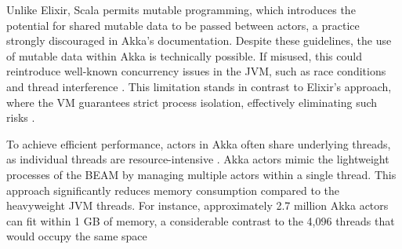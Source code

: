 Unlike Elixir, Scala permits mutable programming, which introduces the potential for shared mutable data to be passed between actors, a practice strongly discouraged in Akka’s documentation. Despite these guidelines, the use of mutable data within Akka is technically possible. If misused, this could reintroduce well-known concurrency issues in the JVM, such as race conditions and thread interference \cite{akka-docs}. This limitation stands in contrast to Elixir’s approach, where the \gls{VM} guarantees strict process isolation, effectively eliminating such risks \cite{Juric2024,Valkov2018}.

To achieve efficient performance, actors in Akka often share underlying threads, as individual threads are resource-intensive \cite{Moamen2027}. Akka actors mimic the lightweight processes of the \gls{BEAM} by managing multiple actors within a single thread. This approach significantly reduces memory consumption compared to the heavyweight \gls{JVM} threads. For instance, approximately 2.7 million Akka actors can fit within 1 GB of memory, a considerable contrast to the 4,096 threads that would occupy the same space \cite{Abraham2023}

